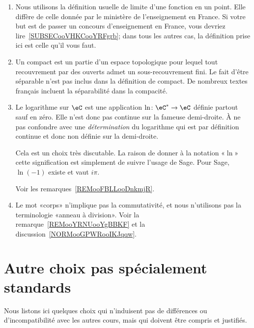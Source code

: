 \begin{enumerate}
    \item
        Nous utilisons la définition usuelle de limite d'une fonction en un point. Elle diffère de celle donnée par le ministère de l'enseignement en France. Si votre but est de passer un concours d'enseignement en France, vous devriez lire~\ref{SUBSECooVHKCooYRFgrb}; dans tous les autres cas, la définition prise ici est celle qu'il vous faut.
    \item
        Un compact est un partie d'un espace topologique pour lequel tout recouvrement par des ouverts admet un sous-recouvrement fini. Le fait d'être séparable n'est pas inclus dans la définition de compact. De nombreux textes français incluent la séparabilité dans la compacité.
    \item
        Le logarithme sur \( \eC\) est une application \( \ln\colon \eC^*\to \eC\) définie partout sauf en zéro. Elle n'est donc pas continue sur la fameuse demi-droite. À ne pas confondre avec une \emph{détermination} du logarithme qui est par définition continue et donc non définie sur la demi-droite.

        Cela est un choix très discutable. La raison de donner à la notation «\( \ln\)» cette signification est simplement de suivre l'usage de Sage. Pour Sage, \( \ln(-1)\) existe et vaut \( i\pi\).

        Voir les remarques~\ref{REMooFBLLooDnkmjR}.
    \item
        Le mot «corps» n'implique pas la commutativité, et nous n'utilisons pas la terminologie «anneau à division». Voir la remarque~\ref{REMooYRNUooYgBBKF} et la discussion~\ref{NORMooGPWRooIKJqqw}.
\end{enumerate}

\section{Autre choix pas spécialement standards}

Nous listons ici quelques choix qui n'induisent pas de différences ou d'incompatibilité avec les autres cours, mais qui doivent être compris et justifiés.

